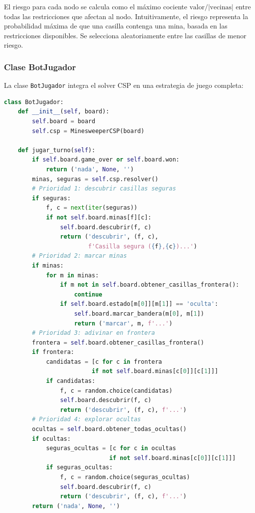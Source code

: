 \documentclass[12pt,a4paper]{article}
\begin{document}
El riesgo para cada nodo se calcula como el máximo cociente $\text{valor}/|\text{vecinas}|$ entre todas las restricciones que afectan al nodo. Intuitivamente, el riesgo representa la probabilidad máxima de que una casilla contenga una mina, basada en las restricciones disponibles. Se selecciona aleatoriamente entre las casillas de menor riesgo.

\subsubsection{Clase BotJugador}

La clase \texttt{BotJugador} integra el solver CSP en una estrategia de juego completa:

\begin{lstlisting}[language=Python, caption={Clase BotJugador.}]
class BotJugador:
    def __init__(self, board):
        self.board = board
        self.csp = MinesweeperCSP(board)

    def jugar_turno(self):
        if self.board.game_over or self.board.won:
            return ('nada', None, '')
        minas, seguras = self.csp.resolver()
        # Prioridad 1: descubrir casillas seguras
        if seguras:
            f, c = next(iter(seguras))
            if not self.board.minas[f][c]:
                self.board.descubrir(f, c)
                return ('descubrir', (f, c),
                        f'Casilla segura ({f},{c})...')
        # Prioridad 2: marcar minas
        if minas:
            for m in minas:
                if m not in self.board.obtener_casillas_frontera():
                    continue
                if self.board.estado[m[0]][m[1]] == 'oculta':
                    self.board.marcar_bandera(m[0], m[1])
                    return ('marcar', m, f'...')
        # Prioridad 3: adivinar en frontera
        frontera = self.board.obtener_casillas_frontera()
        if frontera:
            candidatas = [c for c in frontera
                         if not self.board.minas[c[0]][c[1]]]
            if candidatas:
                f, c = random.choice(candidatas)
                self.board.descubrir(f, c)
                return ('descubrir', (f, c), f'...')
        # Prioridad 4: explorar ocultas
        ocultas = self.board.obtener_todas_ocultas()
        if ocultas:
            seguras_ocultas = [c for c in ocultas
                              if not self.board.minas[c[0]][c[1]]]
            if seguras_ocultas:
                f, c = random.choice(seguras_ocultas)
                self.board.descubrir(f, c)
                return ('descubrir', (f, c), f'...')
        return ('nada', None, '')
\end{lstlisting}
\end{document}
